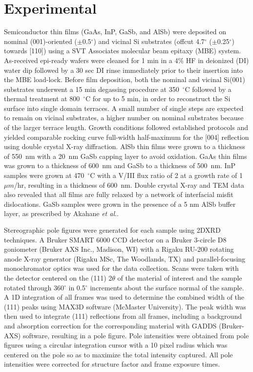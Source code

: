 \section{Experimental} 
Semiconductor thin films (GaAs, InP, GaSb, and AlSb) were deposited on nominal 
(001)-oriented ($\pm$0.5$^\circ$) and vicinal Si substrates (offcut 
4.7$^\circ$ ($\pm$0.25$^\circ$) towards [110]) using a SVT Associates 
molecular beam epitaxy (MBE) system. As-received epi-ready wafers were cleaned 
for 1 min in a 4\% HF in deionized (DI) water dip followed by a 30 sec DI 
rinse immediately prior to their insertion into the MBE load-lock. Before film 
deposition, both the nominal and vicinal Si(001) substrates underwent a 15 min 
degassing procedure at 350~$^\circ$C followed by a thermal treatment at 
800~$^\circ$C for up to 5 min, in order to reconstruct the Si surface into 
single domain 
terraces\cite{NeergaardWaltenburg1995,S1991,Sakamoto1986,Pehlke1991}. A small 
number of single steps are expected to remain on vicinal substrates, a higher 
number on nominal substrates because of the larger terrace length. Growth 
conditions followed established 
protocols\cite{Akahane2004,Balakrishnan2006a,Fischer1986} and yielded 
comparable rocking curve full-width half-maximum for the [004] reflection 
using double crystal X-ray diffraction. AlSb thin films were grown to a 
thickness of 550~nm with a 20~nm GaSb capping layer to avoid oxidation. GaAs 
thin films was grown to a thickness of 600~nm and GaSb to a thickness of 
500~nm. InP samples were grown at 470~$^\circ$C with a V/III flux ratio of 2 
at a growth rate of 1 $\mu m$/hr, resulting in a thickness of 600~nm. Double 
crystal X-ray and TEM data also revealed that all films are fully relaxed by a 
network of interfacial misfit dislocations\cite{Vajargah2011}. GaSb samples 
were grown in the presence of a 5 nm AlSb buffer layer, as prescribed by 
Akahane \textit{et al}.\cite{Akahane2004}.

Stereographic pole figures were generated for each sample using 2DXRD 
techniques. A Bruker SMART 6000 CCD detector on a Bruker 3-circle D8 
goniometer (Bruker AXS Inc., Madison, WI) with a Rigaku RU-200 rotating anode 
X-ray generator (Rigaku MSc, The Woodlands, TX) and parallel-focusing 
monochromator optics was used for the data collection. Scans were taken with 
the detector centered on the (111) 2$\theta$ of the material of interest and 
the sample rotated through 360$^\circ$ in 0.5$^\circ$ increments about the 
surface normal of the sample. A 1D integration of all frames was used to 
determine the combined width of the (111) peaks using MAX3D software (McMaster 
University)\cite{Britten2007}. The peak width was then used to integrate (111) 
reflections from all frames, including a background and absorption correction 
for the corresponding material with GADDS (Bruker-AXS) software, resulting in 
a pole figure. Pole intensities were obtained from pole figures using a 
circular integration cursor with a 10 pixel radius which was centered on the 
pole so as to maximize the total intensity captured. All pole intensities were 
corrected for structure factor and frame exposure times.

